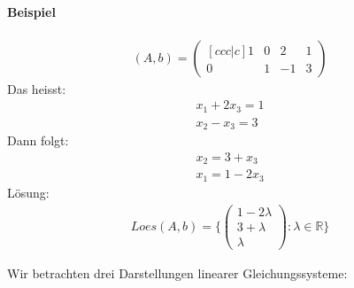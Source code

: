 \documentclass[11pt]{report}
\newcommand*\Zb[1] {\mathbb{#1}}
\begin{document}
\paragraph{Beispiel}
\begin{align}
 (A, b) = \begin{pmatrix}[ccc|c] 1 & 0 & 2 & 1 \\ 0 & 1 & -1 & 3 \end{pmatrix}
\end{align}
Das heisst:
\begin{align}
 x_1 + 2x_3 = 1 \\
 x_2 - x_3 = 3
\end{align}
Dann folgt:
\begin{align}
 x_2 = 3 + x_3 \\
 x_1 = 1 - 2 x_3
\end{align}
Lösung: 
\begin{align}
Loes(A, b) = \{ \begin{pmatrix} 1 - 2\lambda \\ 3 + \lambda \\ \lambda \end{pmatrix}: \lambda \in \Zb{R}\} 
\end{align}

Wir betrachten drei Darstellungen linearer Gleichungssysteme:
\end{document}
